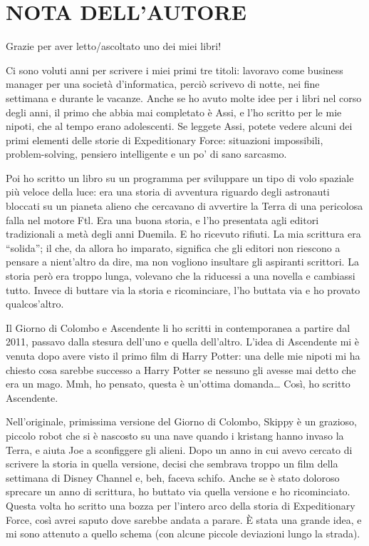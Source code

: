 \chapter{NOTA DELL'AUTORE}\label{nota-dellautore}

\hfill\break

Grazie per aver letto/ascoltato uno dei miei libri!

Ci sono voluti anni per scrivere i miei primi tre titoli: lavoravo come
business manager per una società d'informatica, perciò scrivevo di
notte, nei fine settimana e durante le vacanze. Anche se ho avuto molte
idee per i libri nel corso degli anni, il primo che abbia mai completato
è Assi, e l'ho scritto per le mie nipoti, che al tempo erano
adolescenti. Se leggete Assi, potete vedere alcuni dei primi elementi
delle storie di Expeditionary Force: situazioni impossibili,
problem-solving, pensiero intelligente e un po' di sano sarcasmo.

Poi ho scritto un libro su un programma per sviluppare un tipo di volo
spaziale più veloce della luce: era una storia di avventura riguardo
degli astronauti bloccati su un pianeta alieno che cercavano di
avvertire la Terra di una pericolosa falla nel motore Ftl. Era una buona
storia, e l'ho presentata agli editori tradizionali a metà degli anni
Duemila. E ho ricevuto rifiuti. La mia scrittura era ``solida''; il che,
da allora ho imparato, significa che gli editori non riescono a pensare
a nient'altro da dire, ma non vogliono insultare gli aspiranti
scrittori. La storia però era troppo lunga, volevano che la riducessi a
una novella e cambiassi tutto. Invece di buttare via la storia e
ricominciare, l'ho buttata via e ho provato qualcos'altro.

Il Giorno di Colombo e Ascendente li ho scritti in contemporanea a
partire dal 2011, passavo dalla stesura dell'uno e quella dell'altro.
L'idea di Ascendente mi è venuta dopo avere visto il primo film di Harry
Potter: una delle mie nipoti mi ha chiesto cosa sarebbe successo a Harry
Potter se nessuno gli avesse mai detto che era un mago. Mmh, ho pensato,
questa è un'ottima domanda\ldots{} Così, ho scritto Ascendente.

Nell'originale, primissima versione del Giorno di Colombo, Skippy è un
grazioso, piccolo robot che si è nascosto su una nave quando i kristang
hanno invaso la Terra, e aiuta Joe a sconfiggere gli alieni. Dopo un
anno in cui avevo cercato di scrivere la storia in quella versione,
decisi che sembrava troppo un film della settimana di Disney Channel e,
beh, faceva schifo. Anche se è stato doloroso sprecare un anno di
scrittura, ho buttato via quella versione e ho ricominciato. Questa
volta ho scritto una bozza per l'intero arco della storia di
Expeditionary Force, così avrei saputo dove sarebbe andata a parare. È
stata una grande idea, e mi sono attenuto a quello schema (con alcune
piccole deviazioni lungo la strada).

